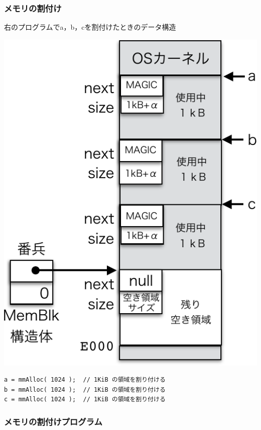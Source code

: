 \documentclass{beamer}                   %
\begin{document}
\begin{frame}[fragile]
  \frametitle{メモリの割付け}
  右のプログラムでa，b，cを割付けたときのデータ構造
  \begin{center}
    \begin{minipage}{0.39\columnwidth}
    \includegraphics[scale=0.5]{Fig/mmAlloc-crop.pdf}
    \end{minipage}
    \begin{minipage}{0.59\columnwidth}
      \begin{lstlisting}
a = mmAlloc( 1024 );  // 1KiB の領域を割り付ける
b = mmAlloc( 1024 );  // 1KiB の領域を割り付ける
c = mmAlloc( 1024 );  // 1KiB の領域を割り付ける
      \end{lstlisting}
    \end{minipage}
  \end{center}
\end{frame}

\begin{frame}
  \frametitle{メモリの割付けプログラム}
  
\end{frame}
\end{document}
